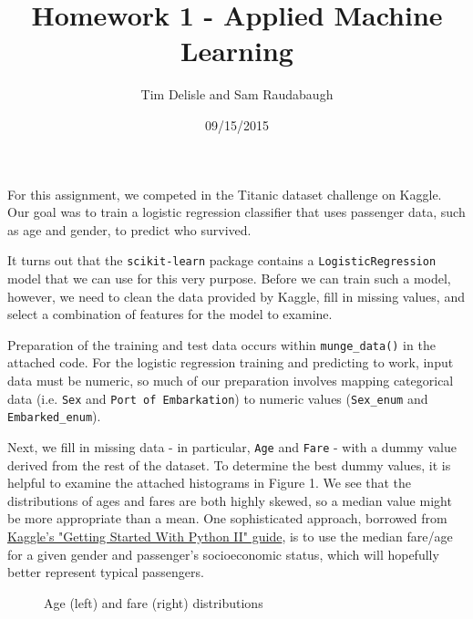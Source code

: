 \documentclass[12pt]{report}
\begin{document}
\lstset{language=Python}

\title{Homework 1 - Applied Machine Learning}
\author{Tim Delisle and Sam Raudabaugh}
\date{09/15/2015}
\maketitle



For this assignment, we competed in the Titanic dataset challenge on Kaggle. Our goal was to train a logistic regression classifier that uses passenger data, such as age and gender, to predict who
survived.

It turns out that the \verb+scikit-learn+ package contains a \verb+LogisticRegression+ model that we can use for this very purpose. Before we can train such a model, however, we need to clean the
data provided by Kaggle, fill in missing values, and select a combination of features for the model to examine.

Preparation of the training and test data occurs within \verb+munge_data()+ in the attached code. For the logistic regression training and predicting to work, input data must be numeric, so much
of our preparation involves mapping categorical data (i.e. \verb+Sex+ and \verb+Port of Embarkation+) to numeric values (\verb+Sex_enum+ and \verb+Embarked_enum+).

Next, we fill in missing data - in particular, \verb+Age+ and \verb+Fare+ - with a dummy value derived from the rest of the dataset. To determine the best dummy values, it is helpful to examine
the attached histograms in Figure 1. We see that the distributions of ages and fares are both highly skewed, so a median value might be more appropriate than a mean. One sophisticated approach,
borrowed from \href{https://www.kaggle.com/c/titanic/details/getting-started-with-python-ii}{Kaggle's "Getting Started With Python II" guide}, is to use the median fare/age for a given gender
and passenger's socioeconomic status, which will hopefully better represent typical passengers.

\begin{figure}
\centering
{}
\caption{Age (left) and fare (right) distributions}
\end{figure}
\end{document}
